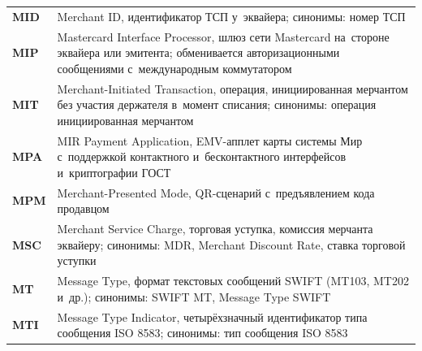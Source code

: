 \begin{longtable}{@{}p{4.5em}p{\dimexpr\linewidth-4.5em-2\tabcolsep\relax}@{}}
  \textbf{MID}               & Merchant ID, идентификатор ТСП у~эквайера; синонимы: номер ТСП                                                                                                                                                                                                                                   \\
  \textbf{MIP}               & Mastercard Interface Processor, шлюз сети Mastercard на~стороне эквайера или эмитента; обменивается авторизационными сообщениями с~международным коммутатором                                                                                                                                       \\
  \textbf{MIT}               & Merchant-Initiated Transaction, операция, инициированная мерчантом без участия держателя в~момент списания; синонимы: операция инициированная мерчантом                                                                                                                                          \\
  \textbf{MPA}               & MIR Payment Application, EMV-апплет карты системы Мир с~поддержкой контактного и~бесконтактного интерфейсов и~криптографии ГОСТ                                                                                                                                                                  \\
  \textbf{MPM}               & Merchant-Presented Mode, QR-сценарий с~предъявлением кода продавцом                                                                                                                                                                                                                              \\
  \textbf{MSC}               & Merchant Service Charge, торговая уступка, комиссия мерчанта эквайеру; синонимы: MDR, Merchant Discount Rate, ставка торговой уступки                                                                                                                                                            \\
  \textbf{MT}                & Message Type, формат текстовых сообщений SWIFT (MT103, MT202 и~др.); синонимы: SWIFT MT, Message Type SWIFT                                                                                                                                                                                       \\
  \textbf{MTI}               & Message Type Indicator, четырёхзначный идентификатор типа сообщения ISO 8583; синонимы: тип сообщения ISO 8583                                                                                                                                                                                   \\

\end{longtable}
